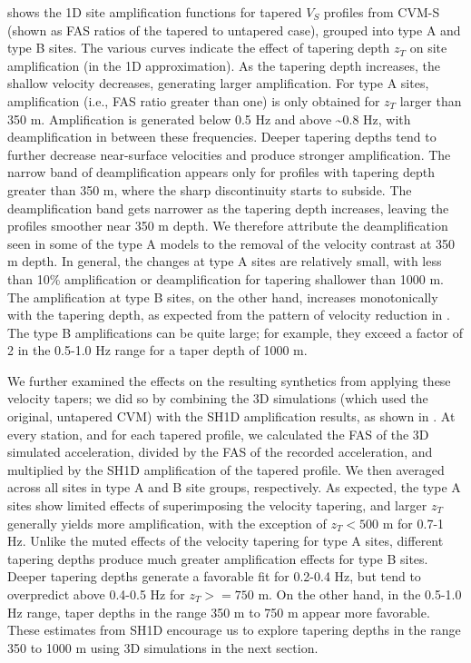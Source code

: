  shows the 1D site amplification functions for tapered $V_S$ profiles from CVM-S (shown as FAS ratios of the tapered to untapered case), grouped into type A and type B sites. The various curves indicate the effect of tapering depth $z_T$ on site amplification (in the 1D approximation). As the tapering depth increases, the shallow velocity decreases, generating larger amplification. For type A sites, amplification (i.e., FAS ratio greater than one) is only obtained for $z_T$ larger than 350 m. Amplification is generated below 0.5 Hz and above \textasciitilde 0.8 Hz, with deamplification in between these frequencies. Deeper tapering depths tend to further decrease near-surface velocities and produce stronger amplification. The narrow band of deamplification appears only for profiles with tapering depth greater than 350 m, where the sharp discontinuity starts to subside. The deamplification band gets narrower as the tapering depth increases, leaving the profiles smoother near 350 m depth. We therefore attribute the deamplification seen in some of the type A models to the removal of the velocity contrast at 350 m depth. In general, the changes at type A sites are relatively small, with less than 10\% amplification or deamplification for tapering shallower than 1000 m. The amplification at type B sites, on the other hand, increases monotonically with the tapering depth, as expected from the pattern of velocity reduction in . The type B amplifications can be quite large; for example, they exceed a factor of 2 in the 0.5-1.0 Hz range for a taper depth of 1000 m.

We further examined the effects on the resulting synthetics from applying these velocity tapers; we did so by combining the 3D simulations (which used the original, untapered CVM) with the SH1D amplification results, as shown in . At every station, and for each tapered profile, we calculated the FAS of the 3D simulated acceleration, divided by the FAS of the recorded acceleration, and multiplied by the SH1D amplification of the tapered profile. We then averaged across all sites in type A and B site groups, respectively. As expected, the type A sites show limited effects of superimposing the velocity tapering, and larger $z_T$ generally yields more amplification, with the exception of $z_T < 500$ m for 0.7-1 Hz. Unlike the muted effects of the velocity tapering for type A sites, different tapering depths produce much greater amplification effects for type B sites. Deeper tapering depths generate a favorable fit for 0.2-0.4 Hz, but tend to overpredict above 0.4-0.5 Hz for $z_T >= 750$ m. On the other hand, in the 0.5-1.0 Hz range, taper depths in the range 350 m to 750 m appear more favorable. These estimates from SH1D encourage us to explore tapering depths in the range 350 to 1000 m using 3D simulations in the next section.

